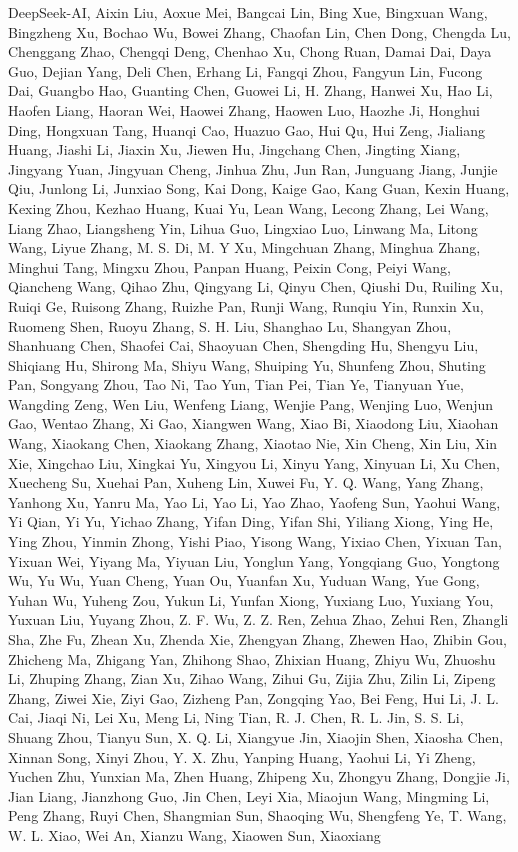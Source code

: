DeepSeek-AI, Aixin Liu, Aoxue Mei, Bangcai Lin, Bing Xue, Bingxuan Wang,
Bingzheng Xu, Bochao Wu, Bowei Zhang, Chaofan Lin, Chen Dong, Chengda
Lu, Chenggang Zhao, Chengqi Deng, Chenhao Xu, Chong Ruan, Damai Dai,
Daya Guo, Dejian Yang, Deli Chen, Erhang Li, Fangqi Zhou, Fangyun Lin,
Fucong Dai, Guangbo Hao, Guanting Chen, Guowei Li, H. Zhang, Hanwei Xu,
Hao Li, Haofen Liang, Haoran Wei, Haowei Zhang, Haowen Luo, Haozhe Ji,
Honghui Ding, Hongxuan Tang, Huanqi Cao, Huazuo Gao, Hui Qu, Hui Zeng,
Jialiang Huang, Jiashi Li, Jiaxin Xu, Jiewen Hu, Jingchang Chen,
Jingting Xiang, Jingyang Yuan, Jingyuan Cheng, Jinhua Zhu, Jun Ran,
Junguang Jiang, Junjie Qiu, Junlong Li, Junxiao Song, Kai Dong, Kaige
Gao, Kang Guan, Kexin Huang, Kexing Zhou, Kezhao Huang, Kuai Yu, Lean
Wang, Lecong Zhang, Lei Wang, Liang Zhao, Liangsheng Yin, Lihua Guo,
Lingxiao Luo, Linwang Ma, Litong Wang, Liyue Zhang, M. S. Di, M. Y Xu,
Mingchuan Zhang, Minghua Zhang, Minghui Tang, Mingxu Zhou, Panpan Huang,
Peixin Cong, Peiyi Wang, Qiancheng Wang, Qihao Zhu, Qingyang Li, Qinyu
Chen, Qiushi Du, Ruiling Xu, Ruiqi Ge, Ruisong Zhang, Ruizhe Pan, Runji
Wang, Runqiu Yin, Runxin Xu, Ruomeng Shen, Ruoyu Zhang, S. H. Liu,
Shanghao Lu, Shangyan Zhou, Shanhuang Chen, Shaofei Cai, Shaoyuan Chen,
Shengding Hu, Shengyu Liu, Shiqiang Hu, Shirong Ma, Shiyu Wang, Shuiping
Yu, Shunfeng Zhou, Shuting Pan, Songyang Zhou, Tao Ni, Tao Yun, Tian
Pei, Tian Ye, Tianyuan Yue, Wangding Zeng, Wen Liu, Wenfeng Liang,
Wenjie Pang, Wenjing Luo, Wenjun Gao, Wentao Zhang, Xi Gao, Xiangwen
Wang, Xiao Bi, Xiaodong Liu, Xiaohan Wang, Xiaokang Chen, Xiaokang
Zhang, Xiaotao Nie, Xin Cheng, Xin Liu, Xin Xie, Xingchao Liu, Xingkai
Yu, Xingyou Li, Xinyu Yang, Xinyuan Li, Xu Chen, Xuecheng Su, Xuehai
Pan, Xuheng Lin, Xuwei Fu, Y. Q. Wang, Yang Zhang, Yanhong Xu, Yanru Ma,
Yao Li, Yao Li, Yao Zhao, Yaofeng Sun, Yaohui Wang, Yi Qian, Yi Yu,
Yichao Zhang, Yifan Ding, Yifan Shi, Yiliang Xiong, Ying He, Ying Zhou,
Yinmin Zhong, Yishi Piao, Yisong Wang, Yixiao Chen, Yixuan Tan, Yixuan
Wei, Yiyang Ma, Yiyuan Liu, Yonglun Yang, Yongqiang Guo, Yongtong Wu, Yu
Wu, Yuan Cheng, Yuan Ou, Yuanfan Xu, Yuduan Wang, Yue Gong, Yuhan Wu,
Yuheng Zou, Yukun Li, Yunfan Xiong, Yuxiang Luo, Yuxiang You, Yuxuan
Liu, Yuyang Zhou, Z. F. Wu, Z. Z. Ren, Zehua Zhao, Zehui Ren, Zhangli
Sha, Zhe Fu, Zhean Xu, Zhenda Xie, Zhengyan Zhang, Zhewen Hao, Zhibin
Gou, Zhicheng Ma, Zhigang Yan, Zhihong Shao, Zhixian Huang, Zhiyu Wu,
Zhuoshu Li, Zhuping Zhang, Zian Xu, Zihao Wang, Zihui Gu, Zijia Zhu,
Zilin Li, Zipeng Zhang, Ziwei Xie, Ziyi Gao, Zizheng Pan, Zongqing Yao,
Bei Feng, Hui Li, J. L. Cai, Jiaqi Ni, Lei Xu, Meng Li, Ning Tian, R. J.
Chen, R. L. Jin, S. S. Li, Shuang Zhou, Tianyu Sun, X. Q. Li, Xiangyue
Jin, Xiaojin Shen, Xiaosha Chen, Xinnan Song, Xinyi Zhou, Y. X. Zhu,
Yanping Huang, Yaohui Li, Yi Zheng, Yuchen Zhu, Yunxian Ma, Zhen Huang,
Zhipeng Xu, Zhongyu Zhang, Dongjie Ji, Jian Liang, Jianzhong Guo, Jin
Chen, Leyi Xia, Miaojun Wang, Mingming Li, Peng Zhang, Ruyi Chen,
Shangmian Sun, Shaoqing Wu, Shengfeng Ye, T. Wang, W. L. Xiao, Wei An,
Xianzu Wang, Xiaowen Sun, Xiaoxiang



